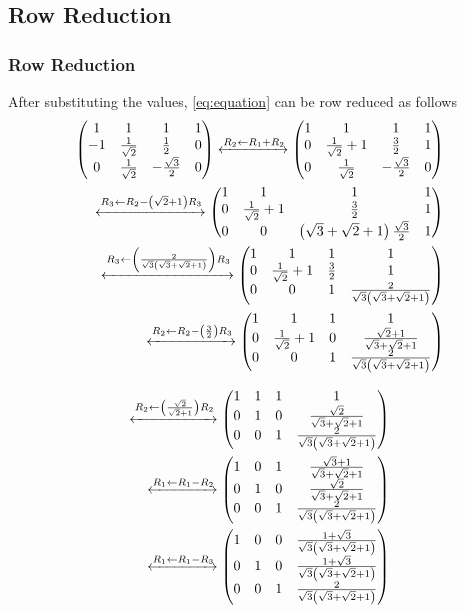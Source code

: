 \documentclass{beamer}
\providecommand{\brak}[1]{\ensuremath{\left(#1\right)}}
\theoremstyle{remark}
\newcommand{\myvec}[1]{\ensuremath{\begin{pmatrix}#1\end{pmatrix}}}
\numberwithin{equation}{section}
\begin{document}
\subsection{Row Reduction}
\begin{frame}
\frametitle{Row Reduction}
After substituting the values, \eqref{eq:equation} can be row reduced as follows
%
\begin{align}
\label{eq:mat_row}
\myvec{1 & 1 & 1 & 1\\-1 & \frac{1}{\sqrt{2}} & \frac{1}{2} & 0\\0 & \frac{1}{\sqrt{2}} & -\frac{\sqrt{3}}{2} & 0} \xleftrightarrow[]{R_2 \leftarrow {R_1+R_2}}\myvec{1 & 1 & 1 & 1\\0 & \frac{1}{\sqrt{2}}+1 & \frac{3}{2} & 1\\0 & \frac{1}{\sqrt{2}} & -\frac{\sqrt{3}}{2} & 0}\\
  \xleftrightarrow[]{R_3 \leftarrow {R_2-\brak{\sqrt{2}+1}R_3}}\myvec{1 & 1 & 1 & 1\\0 & \frac{1}{\sqrt{2}}+1 & \frac{3}{2} & 1\\0 & 0 & \brak{\sqrt{3}+\sqrt{2}+1}\frac{\sqrt{3}}{2} & 1}\\
  \xleftrightarrow[]{R_3 \leftarrow {\brak{\frac{2}{\sqrt{3}\brak{\sqrt{3}+\sqrt{2}+1}}}R_3}}\myvec{1 & 1 & 1 & 1\\0 & \frac{1}{\sqrt{2}}+1 & \frac{3}{2} & 1\\0 & 0 & 1 & \frac{2}{\sqrt{3}\brak{\sqrt{3}+\sqrt{2}+1}}}\\
  \xleftrightarrow[]{R_2 \leftarrow {R_2-\brak{\frac{3}{2}}R_3}}\myvec{1 & 1 & 1 & 1\\0 & \frac{1}{\sqrt{2}}+1 & 0 & \frac{\sqrt{2}+1}{\sqrt{3}+\sqrt{2}+1}\\0 & 0 & 1 & \frac{2}{\sqrt{3}\brak{\sqrt{3}+\sqrt{2}+1}}}
 \end{align}
\end{frame}
\begin{frame}
 \begin{align}
  \xleftrightarrow[]{R_2 \leftarrow \brak{\frac{\sqrt{2}}{\sqrt{2}+1}}R_2}\myvec{1 & 1 & 1 & 1\\0 & 1 & 0 & \frac{\sqrt{2}}{\sqrt{3}+\sqrt{2}+1}\\0 & 0 & 1 & \frac{2}{\sqrt{3}\brak{\sqrt{3}+\sqrt{2}+1}}}\\
  \xleftrightarrow[]{R_1 \leftarrow R_1-R_2}\myvec{1 & 0 & 1 & \frac{\sqrt{3}+1}{\sqrt{3}+\sqrt{2}+1}\\0 & 1 & 0 & \frac{\sqrt{2}}{\sqrt{3}+\sqrt{2}+1}\\0 & 0 & 1 & \frac{2}{\sqrt{3}\brak{\sqrt{3}+\sqrt{2}+1}}}\\
  \xleftrightarrow[]{R_1 \leftarrow R_1-R_3}\myvec{1 & 0 & 0 & \frac{1+\sqrt{3}}{\sqrt{3}\brak{\sqrt{3}+\sqrt{2}+1}}\\0 & 1 & 0 & \frac{1+\sqrt{3}}{\sqrt{3}\brak{\sqrt{3}+\sqrt{2}+1}}\\0 & 0 & 1 & \frac{2}{\sqrt{3}\brak{\sqrt{3}+\sqrt{2}+1}}}
\end{align}
\end{frame}
\end{document}
